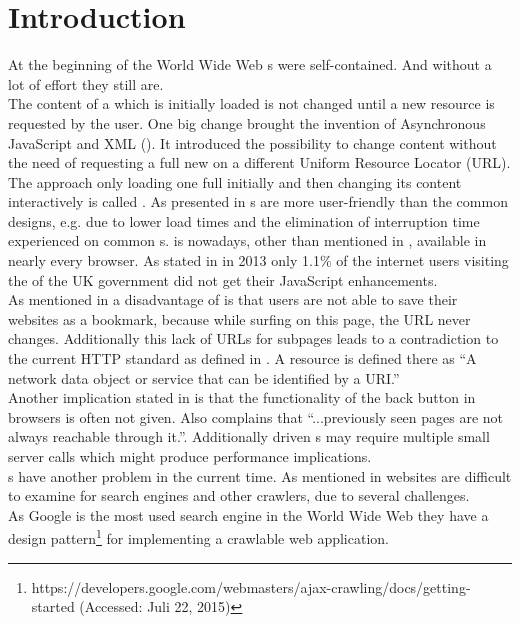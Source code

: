 \section{Introduction}
At the beginning of the World Wide Web \webPage{}s were self-contained. 
And without a lot of effort they still are. 
\\
The content of a \webPage{} which is initially loaded is not changed until a new resource is requested by the user.
One big change brought the invention of Asynchronous JavaScript and XML (\ajax{}).
It introduced the possibility to change content without the need of requesting a full new \webPage{} on a different Uniform Resource Locator (URL).
The approach only loading one full \webPage{} initially and then changing its content interactively is called \singlePageApplication{}.
As presented in \cite{jonsson2009database} \singlePageApplication{}s are more user-friendly than the common designs, e.g. due to lower load times and the elimination of interruption time experienced on common \webApplication{}s.
\ajax{} is nowadays, other than mentioned in \cite{jonsson2009database}, available in nearly every browser.
As stated in \cite{herlihy2013howmany} in 2013 only 1.1\% of the internet users visiting the \webSite{} of the UK government did not get their JavaScript enhancements.
\\
As mentioned in \cite{jonsson2009database} a disadvantage of \ajax{} is that users are not able to save their websites as a bookmark, because while surfing on this page, the URL never changes.
Additionally this lack of URLs for subpages leads to a contradiction to the current HTTP standard as defined in \cite{fielding1999hypertext}.
A resource is defined there as \enquote{A network data object or service that can be identified by a URI.}
\\
Another implication stated in \cite{jonsson2009database} is that the functionality of the back button in browsers is often not given.
Also \cite{estrada2011take} complains that \enquote{...previously seen pages are not always reachable through it.}.
Additionally \ajax{} driven \webApplication{}s may require multiple small server calls which might produce performance implications.
\\
\SinglePageApplication{}s have another problem in the current time. 
As mentioned in \cite{matter2008ajax} \ajax{} websites are difficult to examine for search engines and other crawlers, due to several challenges.
\\
As Google is the most used search engine in the World Wide Web they have a design pattern\footnote{https://developers.google.com/webmasters/ajax-crawling/docs/getting-started (Accessed: Juli 22, 2015)} for implementing a crawlable \ajax{} web application.
